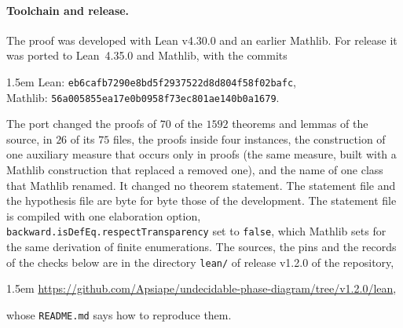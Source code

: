 \paragraph{Toolchain and release.} The proof was developed with Lean v4.30.0 and an earlier Mathlib. For release it was ported to Lean~4.35.0 and Mathlib, with the commits
\begin{flushleft}\small\leftskip1.5em
Lean: \nolinkurl{eb6cafb7290e8bd5f2937522d8d804f58f02bafc},\\
Mathlib: \nolinkurl{56a005855ea17e0b0958f73ec801ae140b0a1679}.
\end{flushleft}
The port changed the proofs of $70$ of the $1592$ theorems and lemmas of the source, in $26$ of its $75$ files, the proofs inside four instances, the construction of one auxiliary measure that occurs only in proofs (the same measure, built with a Mathlib construction that replaced a removed one), and the name of one class that Mathlib renamed. It changed no theorem statement. The statement file and the hypothesis file are byte for byte those of the development. The statement file is compiled with one elaboration option, \texttt{backward.isDefEq.respectTransparency} set to \texttt{false}, which Mathlib sets for the same derivation of finite enumerations. The sources, the pins and the records of the checks below are in the directory \texttt{lean/} of release v1.2.0 of the repository,
\begin{flushleft}\small\leftskip1.5em
\url{https://github.com/Apsiape/undecidable-phase-diagram/tree/v1.2.0/lean},
\end{flushleft}
whose \texttt{README.md} says how to reproduce them.

